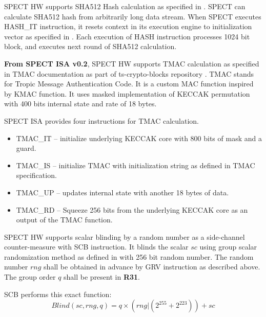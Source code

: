 \documentclass{tropic_design_spec}
\begin{document}


SPECT HW supports SHA512 Hash calculation as specified in \cite{SHA512SPEC}. SPECT can
calculate SHA512 hash from arbitrarily long data stream. When SPECT executes HASH_IT
instruction, it resets context in its execution engine to initialization
vector as specified in \cite{SHA512SPEC}. Each execution of HASH instruction
processes 1024 bit block, and executes next round of SHA512 calculation.



\textbf{From SPECT ISA v0.2}, SPECT HW supports TMAC calculation as specified in TMAC documentation as part of ts-crypto-blocks repository \cite{CRYPTOBLOCKS}.
TMAC stands for Tropic Message Authentication Code. It is a custom MAC function inspired by KMAC function. It uses masked implementation
of KECCAK permutation with 400 bits internal state and rate of 18 bytes.

SPECT ISA provides four instructions for TMAC calculation.
\begin{itemize}
    \item TMAC_IT -- initialize underlying KECCAK core with 800 bits of mask and a guard.
    \item TMAC_IS -- initialize TMAC with initialization string as defined in TMAC specification.
    \item TMAC_UP -- updates internal state with another 18 bytes of data.
    \item TMAC_RD -- Squeeze 256 bits from the underlying KECCAK core as an output of the TMAC function.
\end{itemize}


SPECT HW supports scalar blinding by a random number as a side-channel counter-measure
with SCB instruction. It blinds the scalar $sc$ using group scalar randomization method
as defined in \cite{SCB} with 256 bit random number. The random number $rng$ shall be obtained in
advance by GRV instruction as described above. The group order $q$ shall be present in \textbf{R31}.

SCB performs this exact function: $$Blind(sc, rng, q) = q \times (rng | (2^{255} + 2^{223})) + sc$$
\end{document}
